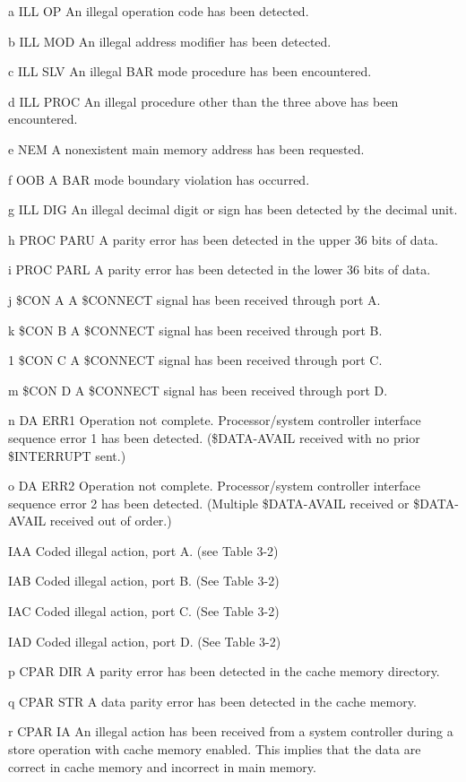 a ILL OP An illegal operation code has been detected.

b ILL MOD An illegal address modifier has been detected.

c ILL SLV An illegal BAR mode procedure has been encountered.

d ILL PROC An illegal procedure other than the three above has been encountered.

e NEM A nonexistent main memory address has been requested.

f OOB A BAR mode boundary violation has occurred.

g ILL DIG An illegal decimal digit or sign has been detected by the decimal unit.

h PROC PARU A parity error has been detected in the upper 36 bits of data.

i PROC PARL A parity error has been detected in the lower 36 bits of data.

j \$CON A A \$CONNECT signal has been received through port A.

k \$CON B A \$CONNECT signal has been received through port B.

1 \$CON C A \$CONNECT signal has been received through port C.

m \$CON D A \$CONNECT signal has been received through port D.

n DA ERR1 Operation not complete. Processor/system controller interface sequence error 1 has been detected. (\$DATA-AVAIL received with no prior \$INTERRUPT sent.)

o DA ERR2 Operation not complete. Processor/system controller interface sequence error 2 has been detected. (Multiple \$DATA-AVAIL received or \$DATA-AVAIL received out of order.)

IAA Coded illegal action, port A. (see Table 3-2)

IAB Coded illegal action, port B. (See Table 3-2)

IAC Coded illegal action, port C. (See Table 3-2)

IAD Coded illegal action, port D. (See Table 3-2)

p CPAR DIR A parity error has been detected in the cache memory directory.

q CPAR STR A data parity error has been detected in the cache memory.

r CPAR IA An illegal action has been received from a system controller during a store operation with cache memory enabled. This implies that the data are correct in cache memory and incorrect in main memory.

